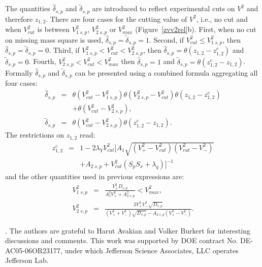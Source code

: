 \documentclass[aps,prd,reprint,groupedaddress,preprintnumbers,showpacs]{revtex4-1}
\begin{document}
The quantities ${\hat \delta}_{s,p}$ and $\tilde \delta_{s,p}$ 
are introduced to reflect experimental cuts on $V^2$ and therefore $z_{1,2}$. There are four cases for the cutting value of $V^2$, i.e., no cut and when  $V^2_{cut}$ is between $V_{1\;s,p}^2$, $V_{2\;s,p}^2$ or $V^2_{max}$ (Figure~\ref{zvv2rel}b). First, when no cut on missing mass square is used, ${\hat \delta}_{s,p}=\tilde \delta_{s,p}=1$. Second, if $V_{cut}^2\leq V_{1\;s,p}^2$, then ${\hat \delta}_{s,p}=\tilde \delta_{s,p}=0$. Third, if $V^2_{1\; s,p}<V^2_{cut}<V^2_{2\; s,p}$, then ${\hat \delta}_{s,p}=\theta(z_{1,2}-z_{1,2}^c)$ and $\tilde \delta_{s,p}=0$. Fourth, $V^2_{2\; s,p}<V^2_{cut}<V^2_{max}$ then ${\hat \delta}_{s,p}=1$ and $\tilde \delta_{s,p}=\theta(z_{1,2}^c-z_{1,2})$. Formally ${\hat \delta}_{s,p}$ and $\tilde \delta_{s,p}$ can be presented using a combined formula aggregating all four cases:
\begin{eqnarray}
{\hat \delta}_{s,p}&=&\theta(V^2_{cut}-V^2_{1\; s,p})\theta(V^2_{2\;s,p}-V^2_{cut})\theta(z_{1,2}-z_{1,2}^c)
\nonumber\\ &&
+\theta(V^2_{cut}-V^2_{2\; s,p}),
\nonumber\\
\tilde \delta_{s,p}&=&\theta(V^2_{cut}-V^2_{2\; s,p})\theta(z_{1,2}^c-z_{1,2}).
\label{delt}
\end{eqnarray}
The restrictions on $z_{1,2}$ read:
\begin{eqnarray}
z_{1,2}^c&=&1-2\lambda_ YV_{cut}^2[A_1\sqrt{(V^2_+-V^2_{cut})(V^2_{cut}-V^2_-)}
\nonumber\\&&
+A_{2\; s,p}+V_{cut}^2(S_pS_x+\lambda_q)]^{-1}
\label{z12c}
\end{eqnarray}
and the other quantities used in previous expressions are:
\begin{eqnarray}
V^2_{1\; s,p}&=&\frac{V^2_+D_{s,p}}{A_1^2V^2_++A_{2\; s,p}^2}<V^2_{max}, \nonumber \\
V^2_{2\; s,p}&=&\frac{2V^2_+V^2_-\sqrt{D_{s,p}}}
{(V^2_++V^2_-)\sqrt{D_{s,p}}-A_{2\; s,p}(V^2_+-V^2_-)   }.
\end{eqnarray}

\vspace{1cm}
. The authors are grateful to Harut
Avakian and Volker Burkert for interesting discussions
and comments. This work was supported by DOE contract
No. DE- AC05-06OR23177, under which Jefferson
Science Associates, LLC operates Jefferson Lab.

{}
%
\end{document}
